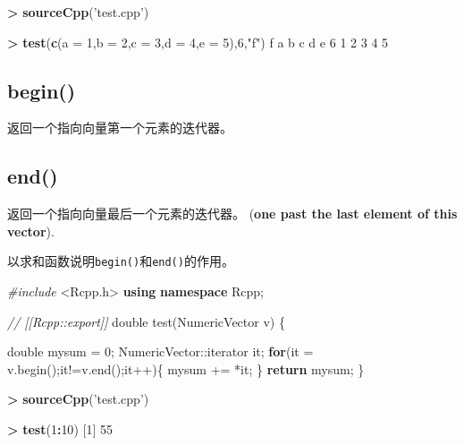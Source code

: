 \documentclass[]{ctexbook}
\newenvironment{Shaded}{\begin{snugshade}}{\end{snugshade}}
\newcommand{\KeywordTok}[1]{\textcolor[rgb]{0.13,0.29,0.53}{\textbf{#1}}}
\newcommand{\DataTypeTok}[1]{\textcolor[rgb]{0.13,0.29,0.53}{#1}}
\newcommand{\DecValTok}[1]{\textcolor[rgb]{0.00,0.00,0.81}{#1}}
\newcommand{\StringTok}[1]{\textcolor[rgb]{0.31,0.60,0.02}{#1}}
\newcommand{\ImportTok}[1]{#1}
\newcommand{\CommentTok}[1]{\textcolor[rgb]{0.56,0.35,0.01}{\textit{#1}}}
\newcommand{\ControlFlowTok}[1]{\textcolor[rgb]{0.13,0.29,0.53}{\textbf{#1}}}
\newcommand{\OperatorTok}[1]{\textcolor[rgb]{0.81,0.36,0.00}{\textbf{#1}}}
\newcommand{\PreprocessorTok}[1]{\textcolor[rgb]{0.56,0.35,0.01}{\textit{#1}}}
\newcommand{\NormalTok}[1]{#1}
\begin{document}
\begin{Shaded}
\begin{Highlighting}[]
\OperatorTok{>}\StringTok{ }\KeywordTok{sourceCpp}\NormalTok{(}\StringTok{'test.cpp'}\NormalTok{)}

\OperatorTok{>}\StringTok{ }\KeywordTok{test}\NormalTok{(}\KeywordTok{c}\NormalTok{(}\DataTypeTok{a =} \DecValTok{1}\NormalTok{,}\DataTypeTok{b =} \DecValTok{2}\NormalTok{,}\DataTypeTok{c =} \DecValTok{3}\NormalTok{,}\DataTypeTok{d =} \DecValTok{4}\NormalTok{,}\DataTypeTok{e =} \DecValTok{5}\NormalTok{),}\DecValTok{6}\NormalTok{,}\StringTok{"f"}\NormalTok{)}
\NormalTok{f a b c d e }
\DecValTok{6} \DecValTok{1} \DecValTok{2} \DecValTok{3} \DecValTok{4} \DecValTok{5} 
\end{Highlighting}
\end{Shaded}

\subsection{begin()}\label{vector-begin}

返回一个指向向量第一个元素的迭代器。

\subsection{end()}\label{vector-end}

返回一个指向向量最后一个元素的迭代器。 (\textbf{one past the last
element of this vector}).

以求和函数说明\texttt{begin()}和\texttt{end()}的作用。

\begin{Shaded}
\begin{Highlighting}[]
\PreprocessorTok{#include }\ImportTok{<Rcpp.h>}
\KeywordTok{using} \KeywordTok{namespace}\NormalTok{ Rcpp;}

\CommentTok{// [[Rcpp::export]]}
\DataTypeTok{double}\NormalTok{ test(NumericVector v) \{}
  
  \DataTypeTok{double}\NormalTok{ mysum = }\DecValTok{0}\NormalTok{;}
\NormalTok{  NumericVector::iterator it;}
  \ControlFlowTok{for}\NormalTok{(it = v.begin();it!=v.end();it++)\{}
\NormalTok{    mysum += *it;}
\NormalTok{  \}}
  \ControlFlowTok{return}\NormalTok{ mysum;}
\NormalTok{\}}
\end{Highlighting}
\end{Shaded}

\begin{Shaded}
\begin{Highlighting}[]
\OperatorTok{>}\StringTok{ }\KeywordTok{sourceCpp}\NormalTok{(}\StringTok{'test.cpp'}\NormalTok{)}

\OperatorTok{>}\StringTok{ }\KeywordTok{test}\NormalTok{(}\DecValTok{1}\OperatorTok{:}\DecValTok{10}\NormalTok{)}
\NormalTok{[}\DecValTok{1}\NormalTok{] }\DecValTok{55}
\end{Highlighting}
\end{Shaded}
\end{document}
